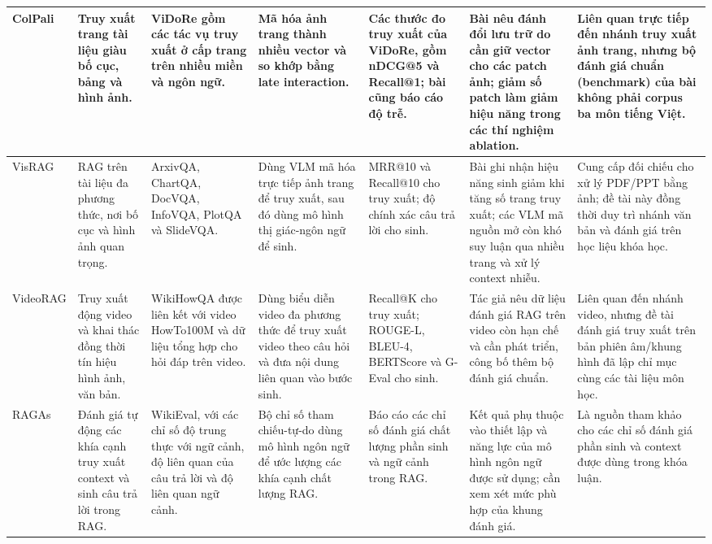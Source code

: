 \begin{landscape}
\begin{longtable}{|p{2.2cm}|p{3.0cm}|p{3.2cm}|p{3.2cm}|p{2.8cm}|p{3.4cm}|p{3.0cm}|}
\hline
ColPali \cite{faysse2025colpali} & Truy xuất trang tài liệu giàu bố cục, bảng và hình ảnh. & ViDoRe gồm các tác vụ truy xuất ở cấp trang trên nhiều miền và ngôn ngữ. & Mã hóa ảnh trang thành nhiều vector và so khớp bằng late interaction. & Các thước đo truy xuất của ViDoRe, gồm nDCG@5 và Recall@1; bài cũng báo cáo độ trễ. & Bài nêu đánh đổi lưu trữ do cần giữ vector cho các patch ảnh; giảm số patch làm giảm hiệu năng trong các thí nghiệm ablation. & Liên quan trực tiếp đến nhánh truy xuất ảnh trang, nhưng bộ đánh giá chuẩn (benchmark) của bài không phải corpus ba môn tiếng Việt. \\
\hline
VisRAG \cite{yu2025visrag} & RAG trên tài liệu đa phương thức, nơi bố cục và hình ảnh quan trọng. & ArxivQA, ChartQA, DocVQA, InfoVQA, PlotQA và SlideVQA. & Dùng VLM mã hóa trực tiếp ảnh trang để truy xuất, sau đó dùng mô hình thị giác-ngôn ngữ để sinh. & MRR@10 và Recall@10 cho truy xuất; độ chính xác câu trả lời cho sinh. & Bài ghi nhận hiệu năng sinh giảm khi tăng số trang truy xuất; các VLM mã nguồn mở còn khó suy luận qua nhiều trang và xử lý context nhiễu. & Cung cấp đối chiếu cho xử lý PDF/PPT bằng ảnh; đề tài này đồng thời duy trì nhánh văn bản và đánh giá trên học liệu khóa học. \\
\hline
VideoRAG \cite{jeong2025videorag} & Truy xuất động video và khai thác đồng thời tín hiệu hình ảnh, văn bản. & WikiHowQA được liên kết với video HowTo100M và dữ liệu tổng hợp cho hỏi đáp trên video. & Dùng biểu diễn video đa phương thức để truy xuất video theo câu hỏi và đưa nội dung liên quan vào bước sinh. & Recall@K cho truy xuất; ROUGE-L, BLEU-4, BERTScore và G-Eval cho sinh. & Tác giả nêu dữ liệu đánh giá RAG trên video còn hạn chế và cần phát triển, công bố thêm bộ đánh giá chuẩn. & Liên quan đến nhánh video, nhưng đề tài đánh giá truy xuất trên bản phiên âm/khung hình đã lập chỉ mục cùng các tài liệu môn học. \\
\hline
RAGAs \cite{es2024ragas} & Đánh giá tự động các khía cạnh truy xuất context và sinh câu trả lời trong RAG. & WikiEval, với các chỉ số độ trung thực với ngữ cảnh, độ liên quan của câu trả lời và độ liên quan ngữ cảnh. & Bộ chỉ số tham chiếu-tự-do dùng mô hình ngôn ngữ để ước lượng các khía cạnh chất lượng RAG. & Báo cáo các chỉ số đánh giá chất lượng phần sinh và ngữ cảnh trong RAG. & Kết quả phụ thuộc vào thiết lập và năng lực của mô hình ngôn ngữ được sử dụng; cần xem xét mức phù hợp của khung đánh giá. & Là nguồn tham khảo cho các chỉ số đánh giá phần sinh và context được dùng trong khóa luận. \\

\end{longtable}
\end{landscape}
